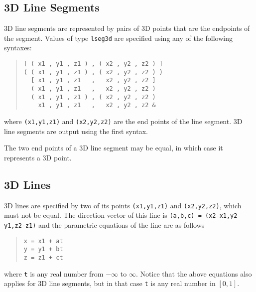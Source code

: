 \documentclass[10pt]{article}
\begin{document}
\begin{comment}
The specific methods for 3D points are as follows:
\begin{itemize}
\item \verb+point3D_x(point Point3D)+: a
\item \verb+point3D_y(point Point3D)+: b
\item \verb+point3D_z(point Point3D)+: c
\item \verb+point3D_horizontal(point1 Point3D, point2 Point3D)+: d
\item \verb+point3D_vertical(point1 Point3D, point2 Point3D)+: e
\item \verb+point3D_perpendicular(point1 Point3D, point2 Point3D)+: f
\item \verb+point3D_collinear(point1 Point3D, point2 Point3D, point3 Point3D)+: g
\end{itemize}
\end{comment}

\subsection{3D Line Segments}

3D line segments are represented by pairs of 3D points that are the endpoints of the segment. 
Values of type \verb+lseg3d+ are specified using any of the following syntaxes:
\begin{quote}
\begin{verbatim}
[ ( x1 , y1 , z1 ) , ( x2 , y2 , z2 ) ]
( ( x1 , y1 , z1 ) , ( x2 , y2 , z2 ) ) 
  [ x1 , y1 , z1   ,   x2 , y2 , z2 ] 
  ( x1 , y1 , z1   ,   x2 , y2 , z2 ) 
  ( x1 , y1 , z1 ) , ( x2 , y2 , z2 )
    x1 , y1 , z1   ,   x2 , y2 , z2 & 
\end{verbatim}
\end{quote}
where \verb+(x1,y1,z1)+ and \verb+(x2,y2,z2)+ are the end points of the line segment.
3D line segments are output using the first syntax.

The two end points of a 3D line segment may be equal, in which case it represents a 3D point.

\subsection{3D Lines}

3D lines are specified by two of its points \verb+(x1,y1,z1)+ and \verb+(x2,y2,z2)+, 
which must not be equal.
The direction vector of this line is \verb+(a,b,c) = (x2-x1,y2-y1,z2-z1)+ and
the parametric equations of the line are as follows
\begin{quote}
\begin{verbatim}
x = x1 + at
y = y1 + bt
z = z1 + ct
\end{verbatim}
\end{quote}
where \verb+t+ is any real number from $-\infty$ to $\infty$. Notice that the above equations also applies
for 3D line segments, but in that case \verb+t+ is any real number in $[0,1]$.
\end{document}
